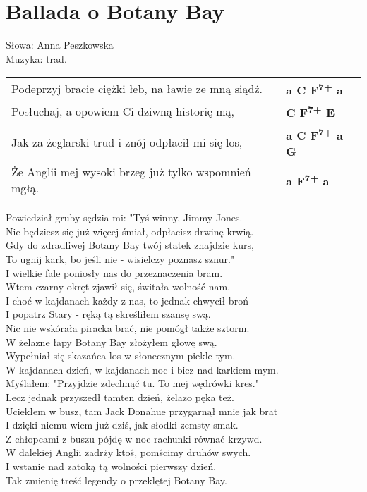 \section{Ballada o Botany Bay}

Słowa: Anna Peszkowska \\
Muzyka:  trad.

\vspace{1em}
\begin{tabular}{@{}p{9cm}@{}l@{}}
Podeprzyj bracie ciężki łeb, na ławie ze mną siądź. & \bfseries  a C F\textsuperscript{7+} a \\
Posłuchaj, a opowiem Ci dziwną historię mą, & \bfseries  C F\textsuperscript{7+} E \\
Jak za żeglarski trud i znój odpłacił mi się los, & \bfseries  a C F\textsuperscript{7+} a G \\
Że Anglii mej wysoki brzeg już tylko wspomnień mgłą. & \bfseries a F\textsuperscript{7+} a \\
\end{tabular}

\vspace{1em}
Powiedział gruby sędzia mi: "Tyś winny, Jimmy Jones. \\
Nie będziesz się już więcej śmiał, odpłacisz drwinę krwią. \\
Gdy do zdradliwej Botany Bay twój statek znajdzie kurs, \\
To ugnij kark, bo jeśli nie - wisielczy poznasz sznur." \\

\vspace{-1em}
I wielkie fale poniosły nas do przeznaczenia bram. \\
Wtem czarny okręt zjawił się, świtała wolność nam. \\
I choć w kajdanach każdy z nas, to jednak chwycił broń \\
I popatrz Stary - ręką tą skreśliłem szansę swą. \\

Nic nie wskórała piracka brać, nie pomógł także sztorm. \\
W żelazne łapy Botany Bay złożyłem głowę swą. \\
Wypełniał się skazańca los w słonecznym piekle tym. \\
W kajdanach dzień, w kajdanach noc i bicz nad karkiem mym. \\

Myślałem: "Przyjdzie zdechnąć tu. To mej wędrówki kres." \\
Lecz jednak przyszedł tamten dzień, żelazo pęka też. \\
Uciekłem w busz, tam Jack Donahue przygarnął mnie jak brat \\
I dzięki niemu wiem już dziś, jak słodki zemsty smak. \\

Z chłopcami z buszu pójdę w noc rachunki równać krzywd. \\
W dalekiej Anglii zadrży ktoś, pomścimy druhów swych. \\
I wstanie nad zatoką tą wolności pierwszy dzień. \\
Tak zmienię treść legendy o przeklętej Botany Bay.